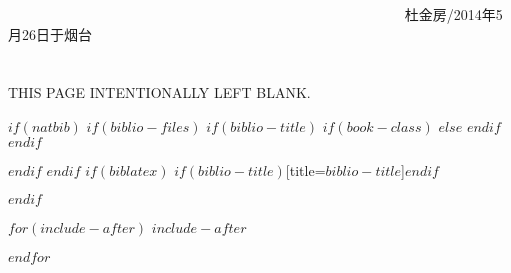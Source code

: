 \documentclass[$if(fontsize)$$fontsize$,$endif$$if(lang)$$lang$,$endif$CJKutf8]{$documentclass$}
\begin{document}
\bigskip
\vfill

　　　　　　　　　　　　　　　　　　　　　　　　　　　 　杜金房/2014年5月26日于烟台

\chapter*{}


THIS PAGE INTENTIONALLY LEFT BLANK.

$if(natbib)$
$if(biblio-files)$
$if(biblio-title)$
$if(book-class)$
\renewcommand\bibname{$biblio-title$}
$else$
\renewcommand\refname{$biblio-title$}
$endif$
$endif$


$endif$
$endif$
$if(biblatex)$
\printbibliography$if(biblio-title)$[title=$biblio-title$]$endif$

$endif$

$for(include-after)$
$include-after$

$endfor$


\end{document}
